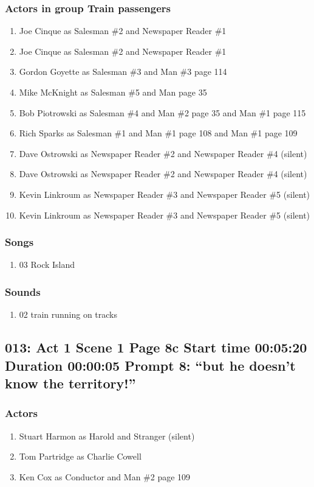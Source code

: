 \subsubsection{Actors in group Train passengers}
\begin{enumerate}
\item Joe Cinque as Salesman \#2 and Newspaper Reader \#1
\item Joe Cinque as Salesman \#2 and Newspaper Reader \#1
\item Gordon Goyette as Salesman \#3 and Man \#3 page 114
\item Mike McKnight as Salesman \#5 and Man page 35
\item Bob Piotrowski as Salesman \#4 and Man \#2 page 35 and Man \#1 page 115
\item Rich Sparks as Salesman \#1 and Man \#1 page 108 and Man \#1 page 109
\item Dave Ostrowski as Newspaper Reader \#2 and Newspaper Reader \#4 (silent)
\item Dave Ostrowski as Newspaper Reader \#2 and Newspaper Reader \#4 (silent)
\item Kevin Linkroum as Newspaper Reader \#3 and Newspaper Reader \#5 (silent)
\item Kevin Linkroum as Newspaper Reader \#3 and Newspaper Reader \#5 (silent)
\end{enumerate}

\subsubsection{Songs}
\begin{enumerate}
\item 03 Rock Island
\end{enumerate}\subsubsection{Sounds}
\begin{enumerate}
\item 02 train running on tracks
\end{enumerate}
\subsection{013: Act 1 Scene 1 Page 8c Start time 00:05:20 Duration 00:00:05 Prompt 8: ``but he doesn't know the territory!''}

\subsubsection{Actors}
\begin{enumerate}
\item Stuart Harmon as Harold and Stranger (silent)
\item Tom Partridge as Charlie Cowell
\item Ken Cox as Conductor and Man \#2 page 109
\end{enumerate}
